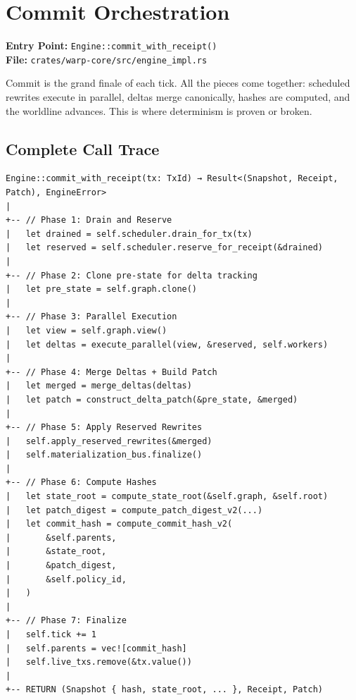 
\chapter{Commit Orchestration}
\label{chap:tour-commit}

\textbf{Entry Point:} \texttt{Engine::commit\_with\_receipt()} \\
\textbf{File:} \texttt{crates/warp-core/src/engine\_impl.rs}

\begin{bigpicture}
Commit is the grand finale of each tick. All the pieces come together: scheduled rewrites execute in parallel, deltas merge canonically, hashes are computed, and the worldline advances. This is where determinism is proven or broken.
\end{bigpicture}

\section{Complete Call Trace}

\begin{verbatim}
Engine::commit_with_receipt(tx: TxId) → Result<(Snapshot, Receipt, Patch), EngineError>
|
+-- // Phase 1: Drain and Reserve
|   let drained = self.scheduler.drain_for_tx(tx)
|   let reserved = self.scheduler.reserve_for_receipt(&drained)
|
+-- // Phase 2: Clone pre-state for delta tracking
|   let pre_state = self.graph.clone()
|
+-- // Phase 3: Parallel Execution
|   let view = self.graph.view()
|   let deltas = execute_parallel(view, &reserved, self.workers)
|
+-- // Phase 4: Merge Deltas + Build Patch
|   let merged = merge_deltas(deltas)
|   let patch = construct_delta_patch(&pre_state, &merged)
|
+-- // Phase 5: Apply Reserved Rewrites
|   self.apply_reserved_rewrites(&merged)
|   self.materialization_bus.finalize()
|
+-- // Phase 6: Compute Hashes
|   let state_root = compute_state_root(&self.graph, &self.root)
|   let patch_digest = compute_patch_digest_v2(...)
|   let commit_hash = compute_commit_hash_v2(
|       &self.parents,
|       &state_root,
|       &patch_digest,
|       &self.policy_id,
|   )
|
+-- // Phase 7: Finalize
|   self.tick += 1
|   self.parents = vec![commit_hash]
|   self.live_txs.remove(&tx.value())
|
+-- RETURN (Snapshot { hash, state_root, ... }, Receipt, Patch)
\end{verbatim}

